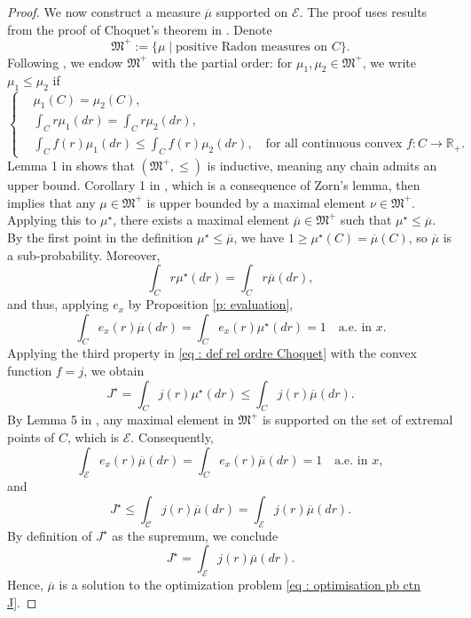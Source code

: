 \documentclass[a4paper, 11pt]{article}
\theoremstyle{definition}
\newcommand{\theconvex}{C}
\begin{document}
{\begin{proof}
We now construct a measure $\overline{\mu}$ supported on $\mathcal{E}$. The proof uses results from the proof of Choquet’s theorem in \cite{Choquet}. Denote
\[
\mathfrak{M}^+ := \{ \mu \mid \text{positive Radon measures on } \theconvex \}.
\]
Following \cite{Choquet}, we endow $\mathfrak{M}^+$ with the partial order: for $\mu_1, \mu_2 \in \mathfrak{M}^+$, we write $\mu_1 \leq \mu_2$ if
\begin{equation} \label{eq : def rel ordre Choquet}
\left\{
\begin{aligned}
&\mu_1(\theconvex) = \mu_2(\theconvex), \\
&\int_\theconvex r \mu_1(dr) = \int_\theconvex r \mu_2(dr), \\
&\int_\theconvex f(r) \mu_1(dr) \leq \int_\theconvex f(r) \mu_2(dr), \quad \text{for all continuous convex } f : \theconvex \to \mathbb{R}_+.
\end{aligned}
\right.
\end{equation}
Lemma 1 in \cite{Choquet} shows that $(\mathfrak{M}^+, \leq)$ is inductive, meaning any chain admits an upper bound. Corollary 1 in \cite{Choquet}, which is a consequence of Zorn's lemma, then implies that any $\mu \in \mathfrak{M}^+$ is upper bounded by a maximal element $\nu \in \mathfrak{M}^+$. Applying this to $\mu^\star$, there exists a maximal element $\overline{\mu} \in \mathfrak{M}^+$ such that $\mu^\star \leq \overline{\mu}$. By the first point in the definition 
 $\mu^\star \leq \overline{\mu}$, we have $1 \geq \mu^\star(\theconvex) = \overline{\mu}(\theconvex)$, so $\overline{\mu}$ is a sub-probability. Moreover,
\[
\int_\theconvex r \mu^\star(dr) = \int_\theconvex r \overline{\mu}(dr),
\]
and thus, applying $e_x$ by Proposition \ref{p: evaluation},
\[
\int_\theconvex e_x(r) \overline{\mu}(dr) = \int_\theconvex e_x(r) \mu^\star(dr) = 1 \quad \text{a.e.\ in } x.
\]
Applying the third property in \eqref{eq : def rel ordre Choquet} with the convex function $f = j$, we obtain
\[
J^\star = \int_\theconvex j(r) \mu^\star(dr) \leq \int_\theconvex j(r) \overline{\mu}(dr).
\]
By Lemma 5 in \cite{Choquet}, any maximal element in $\mathfrak{M}^+$ is supported on the set of extremal points of $\theconvex$, which is $\mathcal{E}$. Consequently,
\[
\int_\mathcal{E} e_x(r) \overline{\mu}(dr) = \int_\theconvex e_x(r) \overline{\mu}(dr) = 1 \quad \text{a.e.\ in } x,
\]
and
\[
J^\star \leq \int_\mathcal{\theconvex} j(r) \overline{\mu}(dr)=\int_\mathcal{E} j(r) \overline{\mu}(dr).
\]
By definition of $J^\star$ as the supremum, we conclude
\[
J^\star = \int_\mathcal{E} j(r) \overline{\mu}(dr).
\]
Hence, $\overline{\mu}$ is a solution to the optimization problem \eqref{eq : optimisation pb ctn J}.
\end{proof}







}
\end{document}
